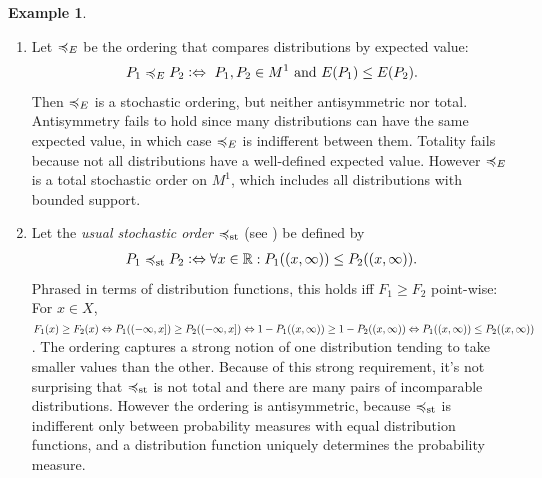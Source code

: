 \documentclass[a4paper]{scrreprt}
\newcommand{\M}{M}
\theoremstyle{definition}
\newtheorem{ex}[thm]{Example} %
\begin{document}
    \begin{ex}~
        \label{ex:stochasticOrdersLeqELeqst}
        \begin{enumerate}
            \item 
            Let $\preccurlyeq_E$ be the ordering that compares distributions by expected value:
            \begin{gather*}
                P_1 \leqE P_2 \colonlra \text{ $P_1, P_2 \in \M^1$ and $E(P_1) \leq E(P_2)$}.
            \end{gather*}
            Then $\preccurlyeq_E$ is a stochastic ordering, but neither antisymmetric nor total. Antisymmetry fails to hold since many distributions can have the same expected value, in which case $\preccurlyeq_E$ is indifferent between them. Totality fails because not all distributions have a well-defined expected value. However $\preccurlyeq_E$ is a total stochastic order on $\M^1$, which includes all distributions with bounded support.
            
            \item Let the \emph{usual stochastic order} $\preccurlyeq_{\text{st}}$ (see \cite{bib:shakedStochasticOrders}) be defined by 
            \begin{gather*}
                P_1 \preccurlyeq_{\text{st}} P_2 \mathrel{\vcentcolon\Leftrightarrow} \forall x \in \mathbb{R}: P_1((x, \infty)) \leq P_2((x, \infty)).
            \end{gather*}
            Phrased in terms of distribution functions, this holds iff $F_1 \geq F_2$ point-wise: For $x \in X$, $F_1(x) \geq F_2(x) \Leftrightarrow P_1((-\infty, x]) \geq P_2((-\infty, x]) \Leftrightarrow 1 - P_1((x, \infty)) \geq 1 - P_2((x, \infty)) \Leftrightarrow P_1((x, \infty)) \leq P_2((x, \infty))$. The ordering captures a strong notion of one distribution tending to take smaller values than the other. Because of this strong requirement, it's not surprising that $\preccurlyeq_{\text{st}}$ is not total and there are many pairs of incomparable distributions. However the ordering is antisymmetric, because $\preccurlyeq_{\text{st}}$ is indifferent only between probability measures with equal distribution functions, and a distribution function uniquely determines the probability measure.
        \end{enumerate}
    \end{ex}

    \let\dpref\dgeq
    \let\dnonpref\dleq
    \let\dstrpref\dgreater
    \let\dstrnonpref\dless
    
\end{document}
